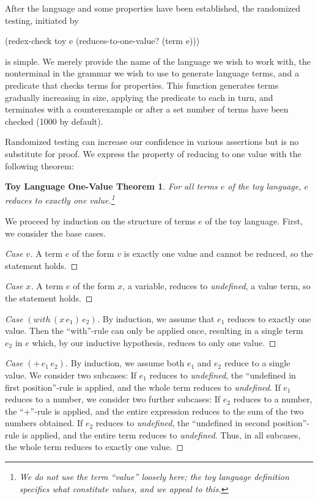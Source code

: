 \documentclass[ms,electronic,twosidetoc,letterpaper,chaptercenter,parttop]{byumsphd}
\begin{document}
After the language and some properties have been established, the randomized testing, 
initiated by
\begin{schemedisplay}
(redex-check toy
             e
             (reduces-to-one-value? (term e)))
\end{schemedisplay}
is simple. We merely provide the name of the language we wish to work with, the
nonterminal in the grammar we wish to use to generate language terms, and a predicate that
checks terms for properties. This function generates terms gradually increasing in size,
applying the predicate to each in turn, and terminates with a counterexample or after a
set number of terms have been checked (1000 by default).

Randomized testing can increase our confidence in various assertions but is no substitute 
for proof. We express the property of reducing to one value with the following theorem:

\newtheorem*{toythm}{Toy Language One-Value Theorem}
\begin{toythm}
For all terms $e$ of the toy language, $e$ reduces to exactly one value.\footnote{We do 
not use the term ``value'' loosely here; the toy language definition specifies what 
constitute values, and we appeal to this.}
\end{toythm}
We proceed by induction on the structure of terms $e$ of the toy language. First, we 
consider the base cases.
\begin{proof}[Case $v$]
A term $e$ of the form $v$ is exactly one value and cannot be reduced, so the statement 
holds.
\end{proof}
\begin{proof}[Case $x$]
A term $e$ of the form $x$, a variable, reduces to \emph{undefined}, a value term, so the 
statement holds.
\end{proof}
\begin{proof}[Case $(with\,(x\,e_{1})\,e_{2})$]
By induction, we assume that $e_{1}$ reduces to exactly one value. Then the ``with''-rule
can only be applied once, resulting in a single term $e_{2}$ in $e$ which, by our
inductive hypothesis, reduces to only one value.
\end{proof}
\begin{proof}[Case $(+\,e_{1}\,e_{2})$]
By induction, we assume both $e_{1}$ and $e_{2}$ reduce to a single value. We consider two
subcases: If $e_{1}$ reduces to \emph{undefined}, the ``undefined in first position''-rule
is applied, and the whole term reduces to \emph{undefined}. If $e_{1}$ reduces to a
number, we consider two further subcases: If $e_{2}$ reduces to a number, the ``+''-rule
is applied, and the entire expression reduces to the sum of the two numbers obtained. If
$e_{2}$ reduces to \emph{undefined}, the ``undefined in second position''-rule is applied,
and the entire term reduces to \emph{undefined}. Thus, in all subcases, the whole term 
reduces to exactly one value.
\end{proof}
\end{document}
